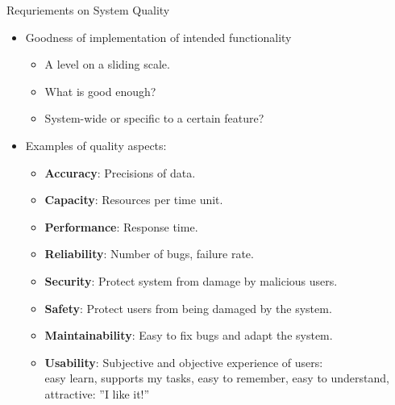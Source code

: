 \documentclass{beamer}
\begin{document}
\begin{frame}[fragile]{Requriements on System Quality}
\begin{itemize}
\item Goodness of implementation of intended functionality 
\begin{itemize}
  \item A level on a sliding scale.
  \item What is good enough?
  \item System-wide or specific to a certain feature?
\end{itemize}
\item Examples of quality aspects:
\begin{itemize}
\item \textbf{Accuracy}: Precisions of data.
\item \textbf{Capacity}: Resources per time unit.
\item \textbf{Performance}: Response time.
\item \textbf{Reliability}: Number of bugs, failure rate.
\item \textbf{Security}: Protect system from damage by malicious users. 
\item \textbf{Safety}: Protect users from being damaged by the system.
\item \textbf{Maintainability}: Easy to fix bugs and adapt the system.
\item \textbf{Usability}: Subjective and objective experience of users:\\ easy learn, supports my tasks, easy to remember, easy to understand, attractive: ''I like it!'' 
\end{itemize}
\end{itemize}
\end{frame}
\end{document}
